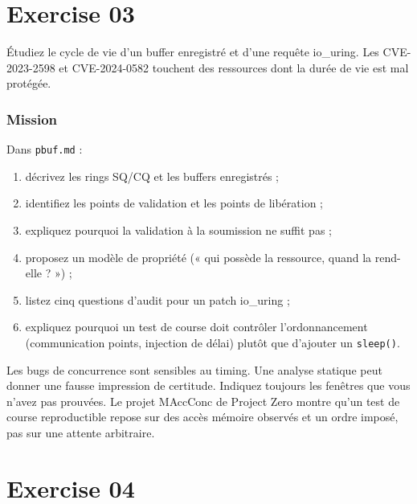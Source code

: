 \documentclass{training}
\begin{document}
\chapter{Exercise 03}
\makeheaderfiles

Étudiez le cycle de vie d'un buffer enregistré et d'une requête io\_uring.
Les CVE-2023-2598 et CVE-2024-0582 touchent des ressources dont la durée de
vie est mal protégée.

\subsection*{Mission}

Dans \texttt{pbuf.md} :

\begin{enumerate}
  \item décrivez les rings SQ/CQ et les buffers enregistrés ;
  \item identifiez les points de validation et les points de libération ;
  \item expliquez pourquoi la validation à la soumission ne suffit pas ;
  \item proposez un modèle de propriété (« qui possède la ressource, quand
        la rend-elle ? ») ;
  \item listez cinq questions d'audit pour un patch io\_uring ;
  \item expliquez pourquoi un test de course doit contrôler l'ordonnancement
        (communication points, injection de délai) plutôt que d'ajouter un
        \texttt{sleep()}.
\end{enumerate}

\begin{warn}
Les bugs de concurrence sont sensibles au timing. Une analyse statique peut
donner une fausse impression de certitude. Indiquez toujours les fenêtres
que vous n'avez pas prouvées. Le projet MAccConc de Project Zero montre
qu'un test de course reproductible repose sur des accès mémoire observés et
un ordre imposé, pas sur une attente arbitraire.
\end{warn}

\chapter{Exercise 04}
\makeheaderfiles
\end{document}
